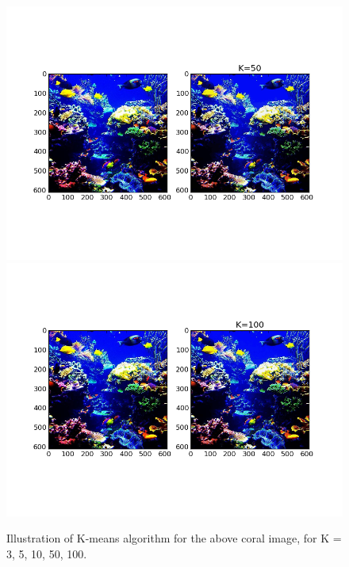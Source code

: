 \documentclass[a4paper,10pt,twoside]{article}
\begin{document}
\begin{figure}
    \includegraphics[trim = 1.5cm 3.5cm 1.5cm 3.5cm ,clip=true, width=1.0\textwidth,height=.2\textheight,keepaspectratio]{figure_2_4.png}
    \includegraphics[trim = 1.5cm 3.5cm 1.5cm 3.5cm ,clip=true, width=1.0\textwidth,height=.2\textheight,keepaspectratio]{figure_2_5.png}
  \caption{Illustration of K-means algorithm for the above coral image, for K = 3, 5, 10, 50, 100.}
  \label{fig:imagekmeans}
\end{figure}
\end{document}
